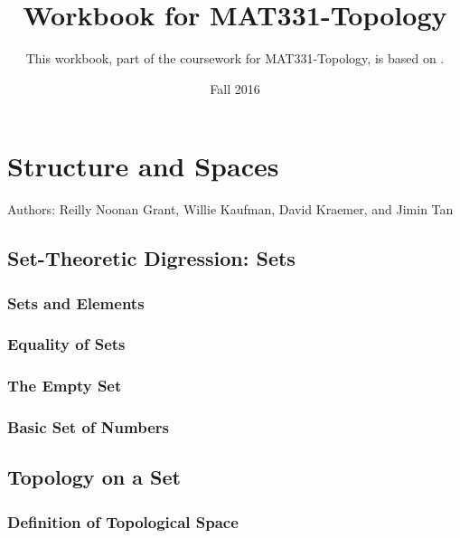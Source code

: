 \documentclass{book}
\title{Workbook for MAT331-Topology}
\date{Fall 2016}
\author{This workbook, part of the coursework for MAT331-Topology, is based on \cite{viro}.}
\begin{document}


\chapter{Structure and Spaces}
Authors: Reilly Noonan Grant, Willie Kaufman, David Kraemer, and Jimin Tan

\section{Set-Theoretic Digression: Sets}
\subsection{Sets and Elements}%
\subsection{Equality of Sets}%
\subsection{The Empty Set}%
\subsection{Basic Set of Numbers}%










\section{Topology on a Set}

\subsection{Definition of Topological Space}




\end{document}
